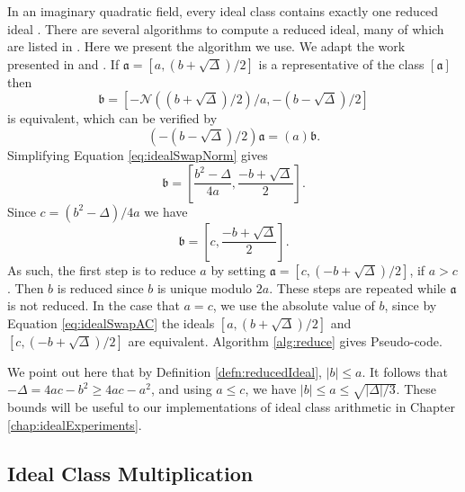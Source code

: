 \documentclass{ucalgthes1}
\theoremstyle{definition}
\newcommand{\ideal}{\mathfrak}
\newcommand{\idealclass}[1]{\left[ \ideal #1 \right]}
\newcommand{\aclass}{\idealclass a}
\begin{document}
In an imaginary quadratic field, every ideal class contains exactly one reduced ideal \cite[p.20]{Ramachandran2006}.  There are several algorithms to compute a reduced ideal, many of which are listed in \cite{Jacobson2006}.  Here we present the algorithm we use.  We adapt the work presented in \cite[p.90]{Jacobson2006} and \cite[p.99]{Jacobson2009}. If $\ideal a = [a, (b + \sqrt\Delta)/2]$ is a representative of the class $\aclass$ then
\begin{equation}
\label{eq:idealSwapNorm}
	\ideal b = \left[ -\mathcal N((b + \sqrt\Delta)/2)/a, -(b - \sqrt\Delta)/2 \right]
\end{equation}
is equivalent, which can be verified by
\[
	\left(-(b - \sqrt\Delta)/2 \right) \ideal a = (a) \ideal b.
\]
Simplifying Equation \ref{eq:idealSwapNorm} gives
\[
	\ideal b = \left[ \frac{b^2-\Delta}{4a}, \frac{-b + \sqrt\Delta}{2} \right].
\]
Since $c = (b^2 - \Delta)/4a$ we have
\begin{equation}
\label{eq:idealSwapAC}
	\ideal b = \left[ c, \frac{-b + \sqrt\Delta}{2} \right].
\end{equation}
As such, the first step is to reduce $a$ by setting $\ideal a = [c, (-b + \sqrt\Delta)/2]$, if $a > c$.  Then $b$ is reduced since $b$ is unique modulo $2a$.  These steps are repeated while $\ideal a$ is not reduced. In the case that $a = c$, we use the absolute value of $b$, since by Equation \ref{eq:idealSwapAC} the ideals $[a, (b + \sqrt\Delta)/2]$ and $[c, (-b+\sqrt\Delta)/2]$ are equivalent.  Algorithm \ref{alg:reduce} gives Pseudo-code.

We point out here that by Definition \ref{defn:reducedIdeal}, $|b| \le a$.  It follows that $-\Delta = 4ac - b^2 \ge 4ac -a^2$, and using $a \le c$, we have $|b| \le a \le \sqrt{|\Delta|/3}$.  These bounds will be useful to our implementations of ideal class arithmetic in Chapter \ref{chap:idealExperiments}.


\subsection{Ideal Class Multiplication}
\label{subsec:idealMultiply}
\end{document}
